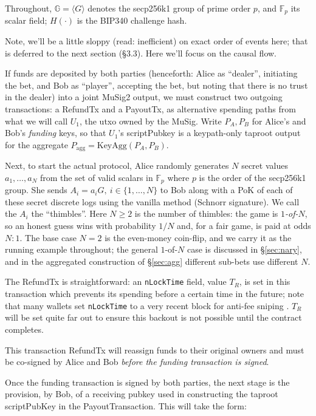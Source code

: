 \documentclass[11pt]{article}
\begin{document}
Throughout, $\mathbb{G}=\langle G\rangle$ denotes the secp256k1 group of prime order $p$, and $\mathbb{F}_p$ its scalar field; $H(\cdot)$ is the BIP340 challenge hash.

Note, we'll be a little sloppy (read: inefficient) on exact order of events here; that is deferred to the next section (\S3.3). Here we'll focus on the causal flow.

If funds are deposited by both parties (henceforth: Alice as ``dealer'', initiating the bet, and Bob as ``player'', accepting the bet, but noting that there is no trust in the dealer) into a joint MuSig2 \cite{musig2,bip327} output, we must construct two outgoing transactions: a RefundTx and a PayoutTx, as alternative spending paths from what we will call $U_1$, the utxo owned by the MuSig. Write $P_A,P_B$ for Alice's and Bob's \emph{funding} keys, so that $U_1$'s scriptPubkey is a keypath-only taproot output for the aggregate $P_{\mathrm{agg}}=\mathrm{KeyAgg}(P_A,P_B)$.

Next, to start the actual protocol, Alice randomly generates $N$ secret values $a_1,\dots,a_N$ from the set of valid scalars in $\mathbb{F}_p$ where $p$ is the order of the secp256k1 group. She sends $A_i = a_i G,\ i \in \{1,\dots,N\}$ to Bob along with a PoK of each of these secret discrete logs using the vanilla method (Schnorr signature). We call the $A_i$ the ``thimbles''. Here $N\ge 2$ is the number of thimbles: the game is \emph{$1$-of-$N$}, so an honest guess wins with probability $1/N$ and, for a fair game, is paid at odds $N{:}1$. The base case $N=2$ is the even-money coin-flip, and we carry it as the running example throughout; the general $1$-of-$N$ case is discussed in \S\ref{sec:nary}, and in the aggregated construction of \S\ref{sec:agg} different sub-bets use different $N$.

The RefundTx is straightforward: an \texttt{nLockTime} field, value $T_R$, is set in this transaction which prevents its spending before a certain time in the future; note that many wallets set \texttt{nLockTime} to a very recent block for anti-fee sniping \cite{antifeesniping}. $T_R$ will be set quite far out to ensure this backout is not possible until the contract completes.

This transaction RefundTx will reassign funds to their original owners and must be co-signed by Alice and Bob \emph{before the funding transaction is signed}.

Once the funding transaction is signed by both parties, the next stage is the provision, by Bob, of a receiving pubkey used in constructing the taproot scriptPubKey in the PayoutTransaction. This will take the form:
\end{document}
